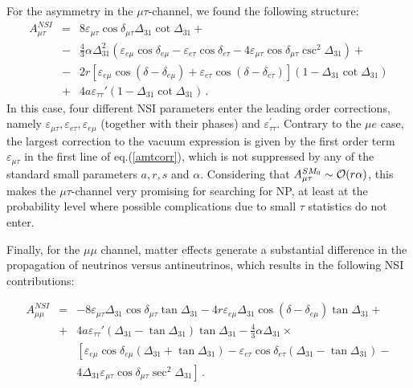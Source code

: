 \documentclass[12pt]{article}
\begin{document}
For the asymmetry in the $\mu\tau$-channel, we found the following structure:
\begin{eqnarray}\nonumber
A_{\mu \tau}^{NSI} &=& 8 \varepsilon_{\mu\tau}\cos\delta_{\mu\tau}\Delta_{31}\cot\Delta_{31} + \\ 
&-&\frac{4}{3}\alpha\Delta_{31}^2\left(\varepsilon_{e\mu}\cos\delta_{e\mu}-\varepsilon_{e\tau}\cos\delta_{e\tau}-4 \varepsilon_{\mu\tau}\cos\delta_{\mu\tau}\csc^2\Delta_{31}\right) + \label{amtcorr}\\
&-&2 r \left[\varepsilon_{e\mu}\cos(\delta-\delta_{e\mu})+\varepsilon_{e\tau}\cos(\delta-\delta_{e\tau})\right]\left(1-\Delta_{31}\cot\Delta_{31}\right) \nonumber
\\
&+& 4 a \varepsilon_{\tau\tau}'\left(1-\Delta_{31}\cot\Delta_{31}\right)\nonumber
\,.
\label{mutau_formul}
\end{eqnarray}
In this case, four different NSI parameters enter the leading order corrections, namely $\varepsilon_{\mu\tau},\varepsilon_{e\tau},\varepsilon_{e\mu}$ (together with their phases) and $\varepsilon^\prime_{\tau\tau}$.
Contrary to the $\mu e$ case, the largest correction to the vacuum expression is given by the first order term $\varepsilon_{\mu\tau}$ in the first line of eq.(\ref{amtcorr}), which is not suppressed by any of the standard small parameters $a,r,s$ and $\alpha$. Considering that  $A_{\mu \tau}^{SM_0} \sim {\cal O}(r\alpha)$, this makes the $\mu \tau$-channel very promising for searching for NP, at least at the probability level where possible complications due to small $\tau$ statistics do not enter. 



Finally,  for the $\mu\mu$ channel, matter effects generate a substantial difference in the propagation of neutrinos versus antineutrinos, which results in the following NSI contributions:


\begin{eqnarray}\nonumber
 A_{\mu\mu}^{NSI} &=& -8 \varepsilon_{\mu\tau} \Delta_{31}  \cos\delta_{\mu\tau}\tan\Delta_{31} - 4 r \varepsilon_{e\mu} \Delta_{31}\cos \left(\delta-\delta_{e\mu}\right)\tan \Delta_{31} + \\
 &+& 4 a \varepsilon_{\tau\tau}' \left(\Delta_{31}-\tan \Delta_{31}\right) \tan\Delta_{31} - \frac{4}{3}\alpha \Delta_{31}\times \\ \nonumber &&\left[\varepsilon_{e\mu}\cos\delta_{e\mu}\left(\Delta_{31}+\tan\Delta_{31}\right)-\varepsilon_{e\tau}\cos\delta_{e\tau}\left(\Delta_{31}-\tan\Delta_{31}\right)- \right.\\ && \left.  4 \Delta_{31}\varepsilon_{\mu\tau}\cos\delta_{\mu\tau}\sec^2\Delta_{31}\right]\nonumber \,.
\end{eqnarray}
\end{document}
